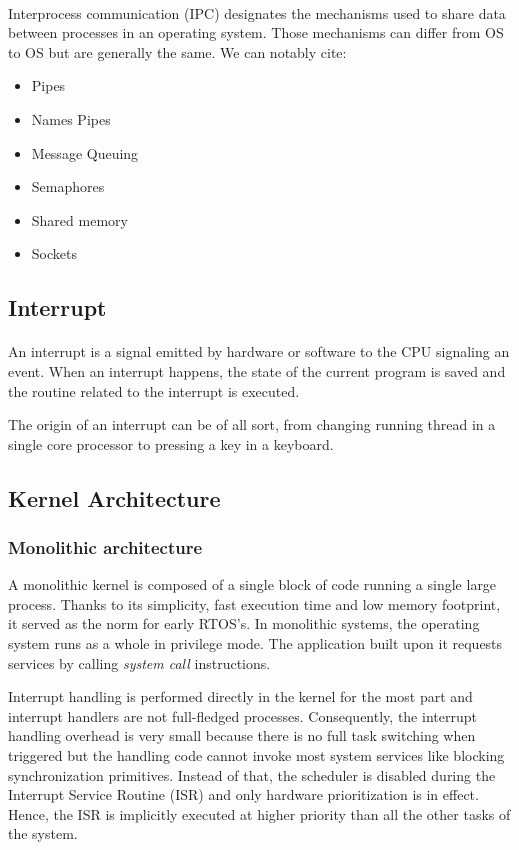 \paragraph{}
Interprocess communication (IPC) designates the mechanisms used to share data between processes in an operating system.
Those mechanisms can differ from OS to OS but are generally the same.
We can notably cite:
\begin{itemize}
    \item Pipes
    \item Names Pipes
    \item Message Queuing
    \item Semaphores
    \item Shared memory
    \item Sockets
\end{itemize}

\subsection{Interrupt}
\paragraph{}
An interrupt is a signal emitted by hardware or software to the CPU signaling an event.
When an interrupt happens, the state of the current program is saved 
    and the routine related to the interrupt is executed.

The origin of an interrupt can be of all sort, 
    from changing running thread in a single core processor to pressing a key in a keyboard.

\subsection{Kernel Architecture}

\subsubsection{Monolithic architecture}
A monolithic kernel is composed of a single block of code running a single large process.
Thanks to its simplicity, fast execution time and low memory footprint, it served as the norm for early RTOS's.
In monolithic systems, the operating system runs as a whole in privilege mode.
The application built upon it requests services by calling \textit{system call} instructions.

Interrupt handling is performed directly in the kernel for the most part and interrupt handlers are not full-fledged processes.
Consequently, the interrupt handling overhead is very small because there is no full task switching when triggered
    but the handling code cannot invoke most system services like blocking synchronization primitives.
Instead of that, the scheduler is disabled during the Interrupt Service Routine (ISR) and only hardware prioritization is in effect.
Hence, the ISR is implicitly executed at higher priority than all the other tasks of the system.

